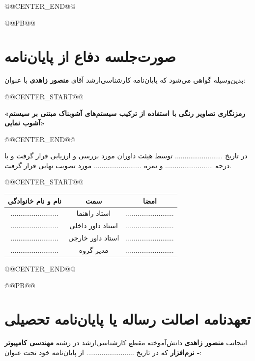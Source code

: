 @@CENTER_END@@




@@PB@@


      
\chapter*{صورت‌جلسه دفاع از پایان‌نامه}

بدین‌وسیله گواهی می‌شود که پایان‌نامه کارشناسی‌ارشد آقای \textbf{منصور زاهدی} با عنوان:


@@CENTER_START@@


\textbf{«رمزنگاری تصاویر رنگی با استفاده از ترکیب سیستم‌های آشوبناک مبتنی بر سیستم آشوب نمایی»}


@@CENTER_END@@


در تاریخ ......................... توسط هیئت داوران مورد بررسی و ارزیابی قرار گرفت و با درجه ......................... و نمره ......................... مورد تصویب نهایی قرار گرفت.

\vspace{2cm}



@@CENTER_START@@


\begin{tabular}{ccc}
\textbf{نام و نام خانوادگی} & \textbf{سمت} & \textbf{امضا} \\ \hline
......................... & استاد راهنما & ......................... \\
......................... & استاد داور داخلی & ......................... \\
......................... & استاد داور خارجی & ......................... \\
......................... & مدیر گروه & ......................... \\
\end{tabular}


@@CENTER_END@@





@@PB@@

          
\chapter*{تعهدنامه اصالت رساله یا پایان‌نامه تحصیلی}

اینجانب \textbf{منصور زاهدی} دانش‌آموخته مقطع کارشناسی‌ارشد در رشته \textbf{مهندسی کامپیوتر - نرم‌افزار} که در تاریخ ......................... از پایان‌نامه خود تحت عنوان:


